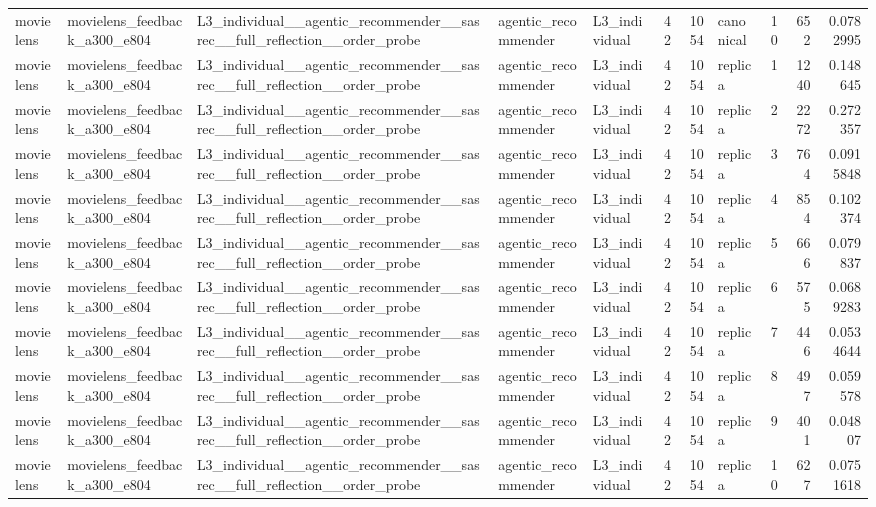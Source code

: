 \begin{table}[htbp!]
\begin{tabular}{lllllrrlrrr}
movielens & movielens\_feedback\_a300\_e804 & L3\_individual\_\_agentic\_recommender\_\_sasrec\_\_full\_reflection\_\_order\_probe & agentic\_recommender & L3\_individual & 42 & 1054 & canonical & 10 & 652 & 0.0782995 \\
movielens & movielens\_feedback\_a300\_e804 & L3\_individual\_\_agentic\_recommender\_\_sasrec\_\_full\_reflection\_\_order\_probe & agentic\_recommender & L3\_individual & 42 & 1054 & replica & 1 & 1240 & 0.148645 \\
movielens & movielens\_feedback\_a300\_e804 & L3\_individual\_\_agentic\_recommender\_\_sasrec\_\_full\_reflection\_\_order\_probe & agentic\_recommender & L3\_individual & 42 & 1054 & replica & 2 & 2272 & 0.272357 \\
movielens & movielens\_feedback\_a300\_e804 & L3\_individual\_\_agentic\_recommender\_\_sasrec\_\_full\_reflection\_\_order\_probe & agentic\_recommender & L3\_individual & 42 & 1054 & replica & 3 & 764 & 0.0915848 \\
movielens & movielens\_feedback\_a300\_e804 & L3\_individual\_\_agentic\_recommender\_\_sasrec\_\_full\_reflection\_\_order\_probe & agentic\_recommender & L3\_individual & 42 & 1054 & replica & 4 & 854 & 0.102374 \\
movielens & movielens\_feedback\_a300\_e804 & L3\_individual\_\_agentic\_recommender\_\_sasrec\_\_full\_reflection\_\_order\_probe & agentic\_recommender & L3\_individual & 42 & 1054 & replica & 5 & 666 & 0.079837 \\
movielens & movielens\_feedback\_a300\_e804 & L3\_individual\_\_agentic\_recommender\_\_sasrec\_\_full\_reflection\_\_order\_probe & agentic\_recommender & L3\_individual & 42 & 1054 & replica & 6 & 575 & 0.0689283 \\
movielens & movielens\_feedback\_a300\_e804 & L3\_individual\_\_agentic\_recommender\_\_sasrec\_\_full\_reflection\_\_order\_probe & agentic\_recommender & L3\_individual & 42 & 1054 & replica & 7 & 446 & 0.0534644 \\
movielens & movielens\_feedback\_a300\_e804 & L3\_individual\_\_agentic\_recommender\_\_sasrec\_\_full\_reflection\_\_order\_probe & agentic\_recommender & L3\_individual & 42 & 1054 & replica & 8 & 497 & 0.059578 \\
movielens & movielens\_feedback\_a300\_e804 & L3\_individual\_\_agentic\_recommender\_\_sasrec\_\_full\_reflection\_\_order\_probe & agentic\_recommender & L3\_individual & 42 & 1054 & replica & 9 & 401 & 0.04807 \\
movielens & movielens\_feedback\_a300\_e804 & L3\_individual\_\_agentic\_recommender\_\_sasrec\_\_full\_reflection\_\_order\_probe & agentic\_recommender & L3\_individual & 42 & 1054 & replica & 10 & 627 & 0.0751618 \\

\end{tabular}
\end{table}
